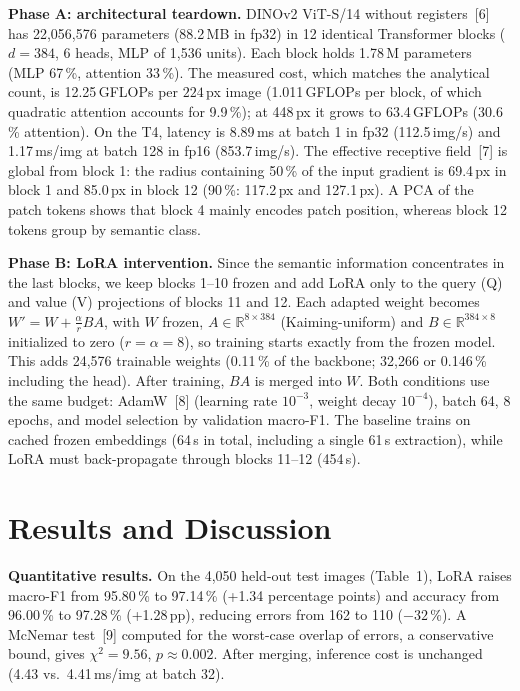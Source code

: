 \documentclass[10pt,a4paper]{article}
\newcommand{\para}[1]{\textbf{#1}\enspace}
\begin{document}
\para{Phase A: architectural teardown.} DINOv2 ViT-S/14 without registers~[6] has 22,056,576 parameters (88.2\,MB in fp32) in 12 identical Transformer blocks ($d=384$, 6 heads, MLP of 1,536 units). Each block holds 1.78\,M parameters (MLP 67\,\%, attention 33\,\%). The measured cost, which matches the analytical count, is 12.25\,GFLOPs per $224$\,px image (1.011\,GFLOPs per block, of which quadratic attention accounts for 9.9\,\%); at 448\,px it grows to 63.4\,GFLOPs (30.6\,\% attention). On the T4, latency is 8.89\,ms at batch 1 in fp32 (112.5\,img/s) and 1.17\,ms/img at batch 128 in fp16 (853.7\,img/s). The effective receptive field~[7] is global from block 1: the radius containing 50\,\% of the input gradient is 69.4\,px in block 1 and 85.0\,px in block 12 (90\,\%: 117.2\,px and 127.1\,px). A PCA of the patch tokens shows that block 4 mainly encodes patch position, whereas block 12 tokens group by semantic class.

\para{Phase B: LoRA intervention.} Since the semantic information concentrates in the last blocks, we keep blocks 1--10 frozen and add LoRA only to the query (Q) and value (V) projections of blocks 11 and 12. Each adapted weight becomes $W' = W + \frac{\alpha}{r} BA$, with $W$ frozen, $A \in \mathbb{R}^{8\times384}$ (Kaiming-uniform) and $B \in \mathbb{R}^{384\times8}$ initialized to zero ($r=\alpha=8$), so training starts exactly from the frozen model. This adds 24,576 trainable weights (0.11\,\% of the backbone; 32,266 or 0.146\,\% including the head). After training, $BA$ is merged into $W$. Both conditions use the same budget: AdamW~[8] (learning rate $10^{-3}$, weight decay $10^{-4}$), batch 64, 8 epochs, and model selection by validation macro-F1. The baseline trains on cached frozen embeddings (64\,s in total, including a single 61\,s extraction), while LoRA must back-propagate through blocks 11--12 (454\,s).

\section{Results and Discussion}
\para{Quantitative results.} On the 4,050 held-out test images (Table~1), LoRA raises macro-F1 from 95.80\,\% to 97.14\,\% (+1.34 percentage points) and accuracy from 96.00\,\% to 97.28\,\% (+1.28\,pp), reducing errors from 162 to 110 ($-32$\,\%). A McNemar test~[9] computed for the worst-case overlap of errors, a conservative bound, gives $\chi^2 = 9.56$, $p \approx 0.002$. After merging, inference cost is unchanged (4.43 vs.\ 4.41\,ms/img at batch 32).
\end{document}
